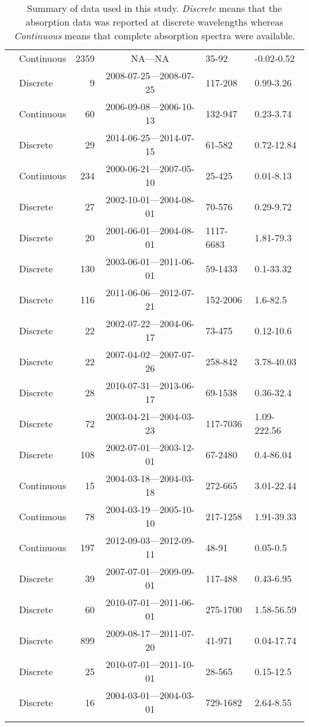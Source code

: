 \begin{longtable}{llrcll}
  \citet{Nelson2002, Nelson2007, Nelson2010} & Continuous & 2359 & NA---NA & 35-92 & -0.02-0.52 \\ 
  \citet{Nguyen2010} & Discrete &   9 & 2008-07-25---2008-07-25 & 117-208 & 0.99-3.26 \\ 
  \citet{Norman2011} & Continuous &  60 & 2006-09-08---2006-10-13 & 132-947 & 0.23-3.74 \\ 
  \citet{Oestreich2016} & Discrete &  29 & 2014-06-25---2014-07-15 & 61-582 & 0.72-12.84 \\ 
  \citet{Osburn2007} & Continuous & 234 & 2000-06-21---2007-05-10 & 25-425 & 0.01-8.13 \\ 
  \citet{Osburn2009} & Discrete &  27 & 2002-10-01---2004-08-01 & 70-576 & 0.29-9.72 \\ 
  \citet{Osburn2011a} & Discrete &  20 & 2001-06-01---2004-08-01 & 1117-6683 & 1.81-79.3 \\ 
  \citet{Osburn2016} & Discrete & 130 & 2003-06-01---2011-06-01 & 59-1433 & 0.1-33.32 \\ 
  \citet{Polaris2012} & Discrete & 116 & 2011-06-06---2012-07-21 & 152-2006 & 1.6-82.5 \\ 
  \citet{Retamal2007} & Discrete &  22 & 2002-07-22---2004-06-17 & 73-475 & 0.12-10.6 \\ 
  \citet{shank2009} & Discrete &  22 & 2007-04-02---2007-07-26 & 258-842 & 3.78-40.03 \\ 
  \citet{Shen2014} & Discrete &  28 & 2010-07-31---2013-06-17 & 69-1538 & 0.36-32.4 \\ 
  \citet{Sickman2010} & Discrete &  72 & 2003-04-21---2004-03-23 & 117-7036 & 1.09-222.56 \\ 
  \citet{Spencer2007, Spencer2007a} & Discrete & 108 & 2002-07-01---2003-12-01 & 67-2480 & 0.4-86.04 \\ 
  \citet{Stedmon2007a} & Continuous &  15 & 2004-03-18---2004-03-18 & 272-665 & 3.01-22.44 \\ 
  \citet{Stedmon2011} & Continuous &  78 & 2004-03-19---2005-10-10 & 217-1258 & 1.91-39.33 \\ 
  \citet{Stedmon2015} & Continuous & 197 & 2012-09-03---2012-09-11 & 48-91 & 0.05-0.5 \\ 
  \citet{Tehrani2013} & Discrete &  39 & 2007-07-01---2009-09-01 & 117-488 & 0.43-6.95 \\ 
  \citet{Wagner2015} & Discrete &  60 & 2010-07-01---2011-06-01 & 275-1700 & 1.58-56.59 \\ 
  \citet{Werdell2003} & Discrete & 899 & 2009-08-17---2011-07-20 & 41-971 & 0.04-17.74 \\ 
  \citet{Yang2013a} & Discrete &  25 & 2010-07-01---2011-10-01 & 28-565 & 0.15-12.5 \\ 
  \citet{Zhang2005} & Discrete &  16 & 2004-03-01---2004-03-01 & 729-1682 & 2.64-8.55 \\ 
   \hline
\hline
\caption{Summary of data used in this study. \textit{Discrete} means that the 
absorption data was reported at discrete wavelengths whereas 
\textit{Continuous} means that complete absorption spectra were available.} 
\end{longtable}
\endgroup
